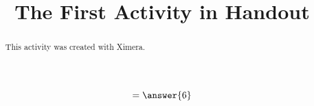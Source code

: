 \documentclass[handout]{ximera}
\title{The First Activity in Handout}
\begin{document}
  
\begin{abstract}  
This activity was created with Ximera.
\end{abstract}  
\maketitle

\begin{problem}  
  \begin{prompt}
    \[
    = \answer{6}
    \]
  \end{prompt}
\end{problem}
\end{document}
